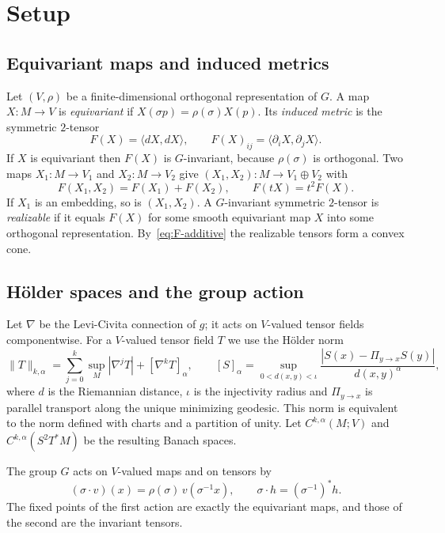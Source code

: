 \documentclass[11pt]{amsart}
\theoremstyle{definition}
\newcommand{\inner}[2]{\langle #1, #2\rangle}
\begin{document}
\section{Setup}\label{sec:setup}

\subsection{Equivariant maps and induced metrics}
Let $(V,\rho)$ be a finite-dimensional orthogonal representation of $G$. A map $X\colon M\to V$
is \emph{equivariant} if $X(\sigma p)=\rho(\sigma)X(p)$. Its \emph{induced metric} is the symmetric
$2$-tensor
\[
F(X) = \inner{dX}{dX},\qquad F(X)_{ij} = \inner{\partial_i X}{\partial_j X}.
\]
If $X$ is equivariant then $F(X)$ is $G$-invariant, because $\rho(\sigma)$ is orthogonal. Two maps
$X_1\colon M\to V_1$ and $X_2\colon M\to V_2$ give $(X_1,X_2)\colon M\to V_1\oplus V_2$ with
\begin{equation}\label{eq:F-additive}
F(X_1,X_2) = F(X_1)+F(X_2),\qquad F(tX) = t^2F(X).
\end{equation}
If $X_1$ is an embedding, so is $(X_1,X_2)$. A $G$-invariant symmetric $2$-tensor is
\emph{realizable} if it equals $F(X)$ for some smooth equivariant map $X$ into some orthogonal
representation. By~\eqref{eq:F-additive} the realizable tensors form a convex cone.

\subsection{H\"older spaces and the group action}\label{subsec:holder}
Let $\nabla$ be the Levi-Civita connection of $g$; it acts on $V$-valued tensor fields
componentwise. For a $V$-valued tensor field $T$ we use the H\"older norm
\[
\|T\|_{k,\alpha} = \sum_{j=0}^{k}\sup_M|\nabla^jT| + [\nabla^kT]_\alpha,\qquad
[S]_\alpha = \sup_{0<d(x,y)<\iota}\frac{|S(x)-\Pi_{y\to x}S(y)|}{d(x,y)^\alpha},
\]
where $d$ is the Riemannian distance, $\iota$ is the injectivity radius and $\Pi_{y\to x}$ is
parallel transport along the unique minimizing geodesic. This norm is equivalent to the norm
defined with charts and a partition of unity. Let $C^{k,\alpha}(M;V)$ and
$C^{k,\alpha}(S^2T^*M)$ be the resulting Banach spaces.

The group $G$ acts on $V$-valued maps and on tensors by
\begin{equation}\label{eq:action}
(\sigma\cdot v)(x) = \rho(\sigma)\,v(\sigma^{-1}x),\qquad \sigma\cdot h = (\sigma^{-1})^*h .
\end{equation}
The fixed points of the first action are exactly the equivariant maps, and those of the second are
the invariant tensors.
\end{document}
